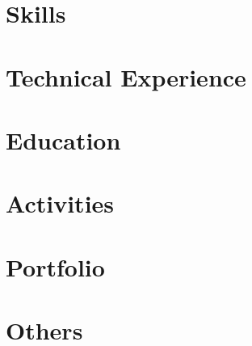 \documentclass[10pt]{article}
\begin{document}
\pagestyle{others}\thispagestyle{first_page}



\section{Skills}


\section{Technical Experience}



\section{Education}


\section{Activities}


\section{Portfolio}


\section{Others}

\end{document}
